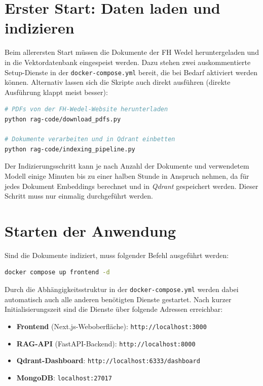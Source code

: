 \section{Erster Start: Daten laden und indizieren}

Beim allerersten Start müssen die Dokumente der FH Wedel heruntergeladen
und in die Vektordatenbank eingespeist werden. Dazu stehen zwei auskommentierte
Setup-Dienste in der \texttt{docker-compose.yml} bereit, die bei Bedarf aktiviert
werden können. Alternativ lassen sich die Skripte auch direkt ausführen (direkte Ausführung klappt meist besser):

\begin{lstlisting}[language=bash, caption={Dokumente herunterladen und indizieren}]
# PDFs von der FH-Wedel-Website herunterladen
python rag-code/download_pdfs.py

# Dokumente verarbeiten und in Qdrant einbetten
python rag-code/indexing_pipeline.py
\end{lstlisting}

Der Indizierungsschritt kann je nach Anzahl der Dokumente und verwendetem Modell
einige Minuten bis zu einer halben Stunde in Anspruch nehmen, da für jedes
Dokument Embeddings berechnet und in \emph{Qdrant} gespeichert werden.
Dieser Schritt muss nur einmalig durchgeführt werden.

\section{Starten der Anwendung}

Sind die Dokumente indiziert, muss folgender Befehl ausgeführt werden:

\begin{lstlisting}[language=bash, caption={Alle Dienste starten}]
docker compose up frontend -d
\end{lstlisting}

Durch die Abhängigkeitsstruktur in der \texttt{docker-compose.yml} werden dabei
automatisch auch alle anderen benötigten Dienste gestartet. Nach kurzer Initialisierungszeit
sind die Dienste über folgende Adressen erreichbar:

\begin{itemize}
    \item \textbf{Frontend} (Next.js-Weboberfläche): \texttt{http://localhost:3000}
    \item \textbf{RAG-API} (FastAPI-Backend): \texttt{http://localhost:8000}
    \item \textbf{Qdrant-Dashboard}: \texttt{http://localhost:6333/dashboard}
    \item \textbf{MongoDB}: \texttt{localhost:27017}
\end{itemize}

